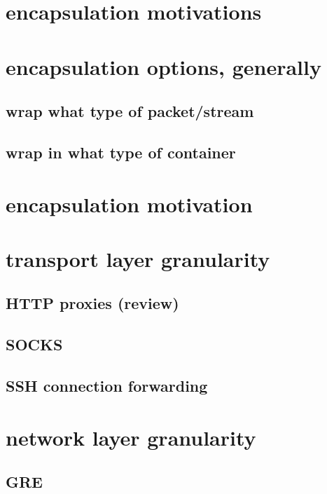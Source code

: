 
\section{encapsulation motivations}



\section{encapsulation options, generally}



\subsection{wrap what type of packet/stream}

\subsection{wrap in what type of container}

\section{encapsulation motivation}

\section{transport layer granularity}

\subsection{HTTP proxies (review)}
\subsection{SOCKS}
\subsection{SSH connection forwarding}

\section{network layer granularity}

\subsection{GRE}
